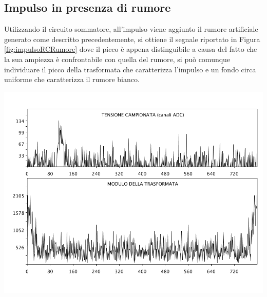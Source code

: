 \documentclass[10pt,oneside,a4paper]{article}
\newenvironment{Figure}
  {\par\medskip\noindent\minipage{\linewidth}}
  {\endminipage\par\medskip}
\begin{document}
\begin{multicols}{2}
\begin{Figure}
\begin{center}
	\label{fig:impulsoRCSommatoreFiltro}
	\end{center}
\end{Figure}

\subsection{Impulso in presenza di rumore}
Utilizzando il circuito sommatore, all'impulso viene aggiunto il rumore artificiale generato come descritto precedentemente, si ottiene il segnale riportato in Figura \ref{fig:impulsoRCRumore} dove il picco è appena distinguibile a causa del fatto che la sua ampiezza è confrontabile con quella del rumore, si può comunque individuare il picco della trasformata che caratterizza l'impulso e un fondo circa uniforme che caratterizza il rumore bianco.
\begin{Figure}
	\begin{center}
	\includegraphics[width=\linewidth]{impulsoRCRumore}
	\label{fig:impulsoRCRumore}
	\end{center}
\end{Figure}


\end{multicols}
\end{document}
